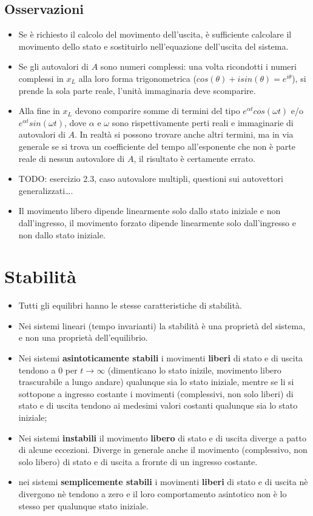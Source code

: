     \subsection{Osservazioni}
    \begin{itemize}
        \item Se è richiesto il calcolo del movimento dell'uscita, è sufficiente calcolare il movimento dello stato e sostituirlo nell'equazione dell'uscita del sistema.
        \item Se gli autovalori di $A$ sono numeri complessi: una volta ricondotti i numeri complessi in $x_L$ alla loro forma trigonometrica ($cos(\theta) + i sin(\theta) = e^{i \theta}$), si prende la sola parte reale, l'unità immaginaria deve scomparire.
        \item Alla fine in $x_L$ devono comparire somme di termini del tipo $e^{\alpha t} cos(\omega t)$ e/o $e^{\alpha t} sin(\omega t)$, dove $\alpha$ e $\omega$ sono rispettivamente perti reali e immaginarie di autovalori di $A$. In realtà si possono trovare anche altri termini, ma in via generale se si trova un coefficiente del tempo all'esponente che non è parte reale di nessun autovalore di $A$, il risultato è certamente errato.
        \item TODO: esercizio 2.3, caso autovalore multipli, questioni sui autovettori generalizzati\dots.
        \item Il movimento libero dipende linearmente solo dallo stato iniziale e non dall’ingresso, il movimento forzato dipende linearmente solo dall’ingresso e non dallo stato iniziale.
    \end{itemize}
    \newpage\section{Stabilità}
    \begin{itemize}
        \item Tutti gli equilibri hanno le stesse caratteristiche di stabilità.
        \item Nei sistemi lineari (tempo invarianti) la stabilità è una proprietà del sistema, e non una proprietà dell’equilibrio. 
        \item Nei sistemi \textbf{asintoticamente stabili} i movimenti \textbf{liberi} di stato e di uscita tendono a $0$ per $t \rightarrow \infty$ (dimenticano lo stato inizile, movimento libero trascurabile a lungo andare) qualunque sia lo stato iniziale, mentre se li si sottopone a ingresso costante i movimenti (complessivi, non solo liberi) di stato e di uscita tendono ai medesimi valori costanti qualunque sia lo stato iniziale;
        \item Nei sistemi \textbf{instabili} il movimento \textbf{libero} di stato e di uscita diverge a patto di alcune eccezioni. Diverge in generale anche il movimento (complessivo, non solo libero) di stato e di uscita a frornte di un ingresso costante.
        \item nei sistemi \textbf{semplicemente stabili} i movimenti \textbf{liberi} di stato e di uscita nè divergono nè tendono a zero e il loro comportamento asintotico non è lo stesso per qualunque stato iniziale.
    \end{itemize}
